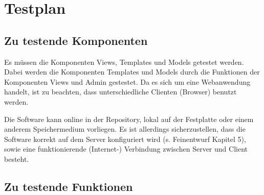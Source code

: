 
\chapter{Testplan}

\section{Zu testende Komponenten}


Es müssen die Komponenten Views, Templates und Models getestet werden.
Dabei werden die Komponenten Templates und Models durch die Funktionen der
Komponenten Views und Admin gestestet. Da es sich um eine Webanwendung handelt,
ist zu beachten, dass unterschiedliche Clienten (Browser) benutzt werden.

Die Software kann online in der Repository, lokal auf der Festplatte oder einem
anderem Speichermedium vorliegen. Es ist allerdings sicherzustellen, dass die
Software korrekt auf dem Server konfiguriert wird (s. Feinentwurf Kapitel 5),
sowie eine funktionierende (Internet-) Verbindung zwischen Server und Client
besteht.

\section{Zu testende Funktionen}

